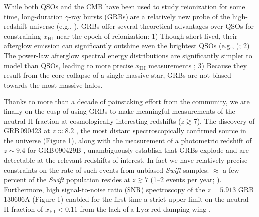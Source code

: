 \documentclass[letterpaper,11pt]{article}
\begin{document}
While both QSOs and the CMB have been used to study reionization for some time, 
long-duration $\gamma$-ray bursts (GRBs) are a relatively new probe of the high-redshift 
universe (e.g., \cite{lr00}).  GRBs offer several theoretical advantages over QSOs
for constraining $x_{\mathrm{H\,I}}$ near the epoch of reionization: 1) Though
short-lived, their afterglow emission can significantly outshine even the brightest
QSOs (e.g., \cite{rks+08,bpl+09,kmk07}); 2) The power-law afterglow spectral energy 
distributions are significantly simpler to model than QSOs, leading to more precise 
$x_{\mathrm{H\,I}}$ measurements \cite{mlz+08}; 3) Because they result from the 
core-collapse of a single massive star, GRBs are not biased towards the most massive halos\cite{mlz+08}.

Thanks to more than a decade of painstaking effort from the community, we are finally
on the cusp of using GRBs to make meaningful measurements of the neutral H fraction 
at cosmologically interesting redshifts ($z \gtrsim 7$).  The discovery of 
GRB\,090423 at $z \approx 8.2$ \cite{tfl+09,sdc+09}, the most distant 
spectroscopically confirmed source in the universe (Figure 1), along with the 
measurement of a photometric redshift of $z \sim 9.4$ for GRB\,090429B \cite{clf+11}, 
unambiguously establish that GRBs explode and are detectable at the relevant redshifts 
of interest.  In fact we have relatively precise constraints on the rate of such events from 
unbiased \textit{Swift} samples: $\approx$ a few percent of the \textit{Swift} population 
resides at $z \gtrsim 7$ (1--2 events per year; \cite{pcb+09,gkk+11}).  Furthermore, 
high signal-to-noise ratio (SNR) spectroscopy of the $z = 5.913$ GRB\,130606A (Figure 1) 
enabled for the first time a strict upper limit on the neutral H fraction of $x_{\mathrm{H\,I}} < 0.11$ 
from the lack of a Ly$\alpha$ red damping wing \cite{cbf+13}.
\end{document}
